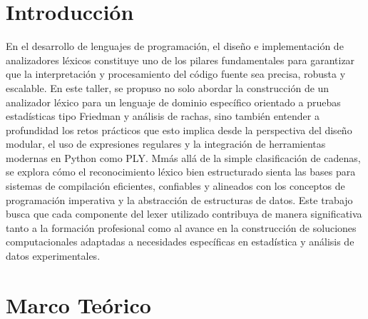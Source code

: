 \documentclass{article}
\begin{document}
\tableofcontents %

\newpage %



\section{Introducción}\label{sec:intr}

En el desarrollo de lenguajes de programación, el diseño e implementación de 
analizadores léxicos constituye uno de los pilares fundamentales para garantizar 
que la interpretación y procesamiento del código fuente sea precisa, robusta 
y escalable. En este taller, se propuso no solo abordar la construcción de un 
analizador léxico para un lenguaje de dominio específico orientado a pruebas 
estadísticas tipo Friedman y análisis de rachas, sino también entender a profundidad 
los retos prácticos que esto implica desde la perspectiva del diseño modular, 
el uso de expresiones regulares y la integración de herramientas modernas en 
Python como PLY. Mmás allá de la simple clasificación de 
cadenas, se explora cómo el reconocimiento léxico bien estructurado sienta las 
bases para sistemas de compilación eficientes, confiables y alineados con 
los conceptos de programación imperativa y la abstracción de estructuras de 
datos. Este trabajo busca que cada componente del lexer utilizado contribuya 
de manera significativa tanto a la formación profesional como al 
avance en la construcción de soluciones computacionales adaptadas a 
necesidades específicas en estadística y análisis de datos experimentales.


\section{Marco Teórico}\label{sec:marc}
\end{document}
